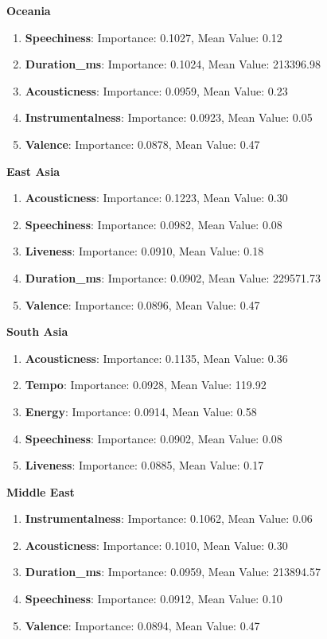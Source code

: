 \textbf{Oceania}
\begin{enumerate}
    \item \textbf{Speechiness}: Importance: 0.1027, Mean Value: 0.12
    \item \textbf{Duration\_ms}: Importance: 0.1024, Mean Value: 213396.98
    \item \textbf{Acousticness}: Importance: 0.0959, Mean Value: 0.23
    \item \textbf{Instrumentalness}: Importance: 0.0923, Mean Value: 0.05
    \item \textbf{Valence}: Importance: 0.0878, Mean Value: 0.47
    
\end{enumerate}

\textbf{East Asia}
\begin{enumerate}
    \item \textbf{Acousticness}: Importance: 0.1223, Mean Value: 0.30
    \item \textbf{Speechiness}: Importance: 0.0982, Mean Value: 0.08
    \item \textbf{Liveness}: Importance: 0.0910, Mean Value: 0.18
    \item \textbf{Duration\_ms}: Importance: 0.0902, Mean Value: 229571.73
    \item \textbf{Valence}: Importance: 0.0896, Mean Value: 0.47
\end{enumerate}

\textbf{South Asia}
\begin{enumerate}
    \item \textbf{Acousticness}: Importance: 0.1135, Mean Value: 0.36
    \item \textbf{Tempo}: Importance: 0.0928, Mean Value: 119.92
    \item \textbf{Energy}: Importance: 0.0914, Mean Value: 0.58
    \item \textbf{Speechiness}: Importance: 0.0902, Mean Value: 0.08
    \item \textbf{Liveness}: Importance: 0.0885, Mean Value: 0.17
\end{enumerate}


\textbf{Middle East}
\begin{enumerate}
    \item \textbf{Instrumentalness}: Importance: 0.1062, Mean Value: 0.06
    \item \textbf{Acousticness}: Importance: 0.1010, Mean Value: 0.30
    \item \textbf{Duration\_ms}: Importance: 0.0959, Mean Value: 213894.57
    \item \textbf{Speechiness}: Importance: 0.0912, Mean Value: 0.10
    \item \textbf{Valence}: Importance: 0.0894, Mean Value: 0.47
\end{enumerate}


